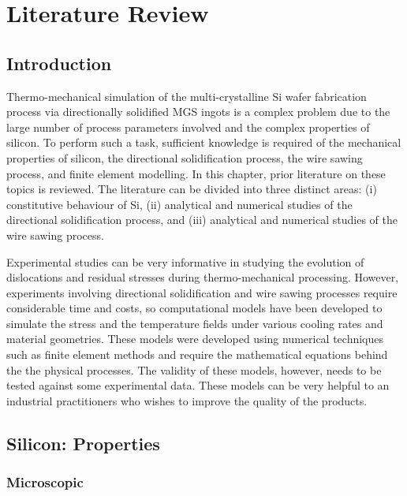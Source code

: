 \chapter{Literature Review}
\section{Introduction}
Thermo-mechanical simulation of the multi-crystalline Si wafer fabrication process via directionally solidified MGS ingots is a complex problem due to the large number of process parameters involved and the complex properties of silicon. To perform such a task, sufficient knowledge is required of the mechanical properties of silicon, the directional solidification process, the wire sawing process, and finite element modelling. In this chapter, prior literature on these topics is reviewed. The literature can be divided into three distinct areas: (i) constitutive behaviour of Si, (ii) analytical and numerical studies of the directional solidification process, and (iii) analytical and numerical studies of the wire sawing process. 

Experimental studies can be very informative in studying the evolution of dislocations and residual stresses during thermo-mechanical processing. However, experiments involving directional solidification and wire sawing processes require considerable time and costs, so computational models have been developed to simulate the stress and the temperature fields under various cooling rates and material geometries. These models were developed using numerical techniques such as finite element methods and require the mathematical equations behind the the physical processes. The validity of these models, however, needs to be tested against some experimental data. These models can be very helpful to an industrial practitioners who wishes to improve the quality of the products.

\section{Silicon: Properties}
\subsection{Microscopic}

